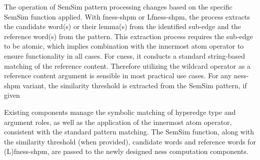 \documentclass[11pt]{scrreprt}
\begin{document}
The operation of SemSim pattern processing changes based on the specific SemSim function applied. With \gls{fness-shpm} or L\gls{fness-shpm}, the process extracts the candidate word(s) or their lemma(s) from the identified sub-edge and the reference word(s) from the pattern. This extraction process requires the sub-edge to be atomic, which implies combination with the innermost atom operator to ensure functionality in all cases. For \gls{cness}, it conducts a standard string-based matching of the reference content. Therefore  utilizing the wildcard operator as a reference content argument is sensible in most practical use cases. For any \gls{ness-shpm} variant, the similarity threshold is extracted from the SemSim pattern, if given

Existing components manage the symbolic matching of hyperedge type and argument roles, as well as the application of the innermost atom operator, consistent with the standard pattern matching. The SemSim function, along with the similarity threshold (when provided), candidate words and reference words for (L)\gls{fness-shpm}, are passed to the newly designed \gls{ness} computation components.
\end{document}
